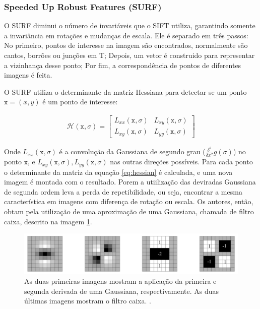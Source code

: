 \subsubsection{Speeded Up Robust Features (SURF)}

  O SURF diminui o número de invariáveis que o SIFT utiliza, garantindo somente a invariância em rotações e mudanças de 
escala. Ele é separado em três passos: No primeiro, pontos de interesse na imagem são encontrados, normalmente são 
cantos, borrões ou junções em T; Depois, um vetor é construido para representar a vizinhança desse ponto; Por fim, a 
correspondência de pontos de diferentes imagens é feita.

  O SURF utiliza o determinante da matriz Hessiana para detectar se um ponto $\mathtt{x} = (x, y)$ é um ponto de 
interesse:

\begin{align}\label{eq:hessian}
    \mathcal{H}(\mathtt{x}, \sigma) = 
      \begin{bmatrix} 
        L_{xx}(\mathtt{x}, \sigma) & L_{xy}(\mathtt{x}, \sigma) \\
        L_{xy}(\mathtt{x}, \sigma) & L_{yy}(\mathtt{x}, \sigma)
      \end{bmatrix}
\end{align}

  Onde $L_{xx}(\mathtt{x}, \sigma)$ é a convolução da Gaussiana de segundo grau ($ \frac{\delta^2}{\delta x^2} g(\sigma) $) 
no ponto $\mathtt{x}$, e $L_{xy}(\mathtt{x}, \sigma), L_{yy}(\mathtt{x}, \sigma)$ nas outras direções possíveis. Para 
cada ponto o determinante da matriz da equação \ref{eq:hessian} é calculada, e uma nova imagem é montada com o resultado.
Porem a utiilização das deviradas Gaussiana de segunda ordem leva a perda de repetibilidade, ou seja, encontrar a mesma 
característica em imagens com diferença de rotação ou escala. Os autores, então, obtam pela utilização de uma aproximação 
de uma Gaussiana, chamada de filtro caixa, descrito na imagem \ref{fig:box}. 

\begin{figure}[h]
    \centering
    \includegraphics[width=1\textwidth]{figuras/boxFilter.png}
    \caption{As duas primeiras imagens mostram a aplicação da primeira e segunda derivada de uma Gaussiana, 
             respectivamente. As duas últimas imagens mostram o filtro caixa. \cite{surfHolroyd}.}
    \label{fig:box}
\end{figure}
  
